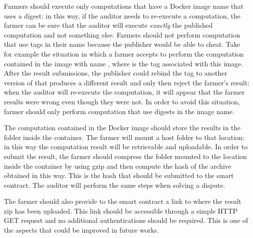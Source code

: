 Farmers should execute only computations that have a Docker image name that uses a digest: in this way, if the auditor needs to re-execute a computation, the farmer can be sure that the auditor will execute \emph{exactly} the published computation and not something else. Farmers should not perform computation that use tags in their name because the publisher would be able to cheat. Take for example the situation in which a farmer accepts to perform the computation contained in the image with name , where  is the tag associated with this image. After the result submissions, the publisher could rebind the tag  to another version of  that produces a different result and only then reject the farmer's result: when the auditor will re-execute the computation, it will appear that the farmer results were wrong even though they were not. In order to avoid this situation, farmer should only perform computation that use digests in the image name.

The computation contained in the Docker image should store the results in the  folder inside the container. The farmer will mount a host folder to that location: in this way the computation result will be retrievable and uploadable. In order to submit the result, the farmer should compress the folder mounted to the  location inside the container by using gzip and then compute the hash of the archive obtained in this way. This is the hash that should be submitted to the smart contract. The auditor will perform the same steps when solving a dispute.

The farmer should also provide to the smart contract a link to where the result zip has been uploaded. This link should be accessible through a simple HTTP GET request and no additional authentications should be required. This is one of the aspects that could be improved in future works.
